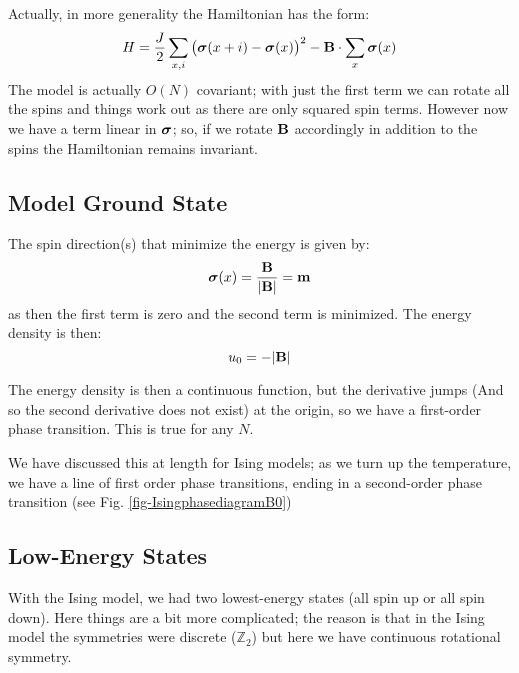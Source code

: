 Actually, in more generality the Hamiltonian has the form:
\begin{equation}
    H = \frac{J}{2}\sum_{x, i}\left(\mbox{\boldmath$ \sigma $}(x + i) - \mbox{\boldmath$ \sigma $}(x)\right)^2 - \mathbf{B} \cdot \sum_x \mbox{\boldmath$ \sigma $}(x)
\end{equation}
The model is actually $O(N)$ covariant; with just the first term we can rotate all the spins and things work out as there are only squared spin terms. However now we have a term linear in $\mbox{\boldmath$ \sigma $}$; so, if we rotate $\mathbf{B}$ accordingly in addition to the spins the Hamiltonian remains invariant.

\subsection{Model Ground State}
The spin direction(s) that minimize the energy is given by:
\begin{equation}
    \mbox{\boldmath$ \sigma $}(x) = \frac{\mathbf{B}}{\lvert \mathbf{B} \rvert} = \mathbf{m}
\end{equation}
as then the first term is zero and the second term is minimized. The energy density is then:
\begin{equation}
    u_0 = -\lvert \mathbf{B} \rvert
\end{equation}

The energy density is then a continuous function, but the derivative jumps (And so the second derivative does not exist) at the origin, so we have a first-order phase transition. This is true for any $N$. 

\begin{comment}
\begin{figure}[htbp]
    \centering
    \begin{tikzpicture}
        \draw[thick, -latex] (0, 0) -- (0, 3);
        \draw[thick, latex-latex] (-3, 0) -- (3, 0);
        \draw[red, -latex] (0, 0) -- (2, 2);
        \draw[red, -latex] (0, 0) -- (-2, 2);
        \node[right]at (0, 3) {$u_0$};
        \node[below] at (3, 0) {$\v{B}$};

    \end{tikzpicture}
    \caption{<caption>}
    \label{<label>}
\end{figure}
\end{comment}

We have discussed this at length for Ising models; as we turn up the temperature, we have a line of first order phase transitions, ending in a second-order phase transition (see Fig. \ref{fig-IsingphasediagramB0})


\subsection{Low-Energy States}
With the Ising model, we had two lowest-energy states (all spin up or all spin down). Here things are a bit more complicated; the reason is that in the Ising model the symmetries were discrete ($\mathbb{Z}_2$) but here we have continuous rotational symmetry.

